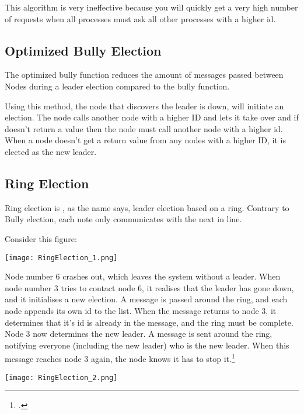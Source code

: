 This algorithm is very ineffective because you will quickly get a very high number of requests when all processes must ask all other processes with a higher id.

\subsection{Optimized Bully Election}
The optimized bully function reduces the amount of messages passed between Nodes during a leader election compared to the bully function.

Using this method, the node that discovers the leader is down, will initiate an election. The node calls another node with a higher ID and lets it take over and if doesn't return a value then the node must call another node with a higher id. When a node doesn't get a return value from any nodes with a higher ID, it is elected as the new leader.

\subsection{Ring Election}
Ring election is , as the name says, leader election based on a ring. Contrary to Bully election, each note only communicates with the next in line.

Consider this figure:

\begin{center}
	\texttt{[image: RingElection\_1.png]}
\end{center}

Node number 6 crashes out, which leaves the system without a leader. When node number 3 tries to contact node 6, it realises that the leader has gone down, and it initialises a new election. A message is passed around the ring, and each node appends its own id to the list. When the message returns to node 3, it determines that it's id is already in the message, and the ring must be complete. Node 3 now determines the new leader. A message is sent around the ring, notifying everyone (including the new leader) who is the new leader. When this message reaches node 3 again, the node knows it has to stop it.\footcite{colostate_RingElec}

\begin{center}
	\texttt{[image: RingElection\_2.png]}
\end{center} 
